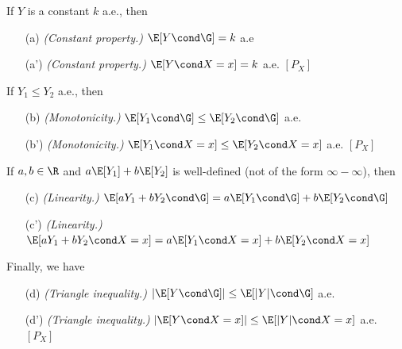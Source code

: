 \documentclass{article} %
\begin{document}
\begin{theorem}
If $Y$ is a constant $k$ a.e., then
\begin{itemize}
	\item[(a)] \textit{(Constant property.)} $\E[Y \cond \G]=k$ a.e
	\item[(a')] \textit{(Constant property.)} $\E[Y \cond X=x]=k$ a.e. $[P_X]$
\end{itemize}
If $Y_1 \leq Y_2$ a.e., then
\begin{itemize}
	\item[(b)] \textit{(Monotonicity.)} $\E[Y_1 \cond \G] \leq \E[Y_2 \cond \G]$ a.e.
	\item[(b')] \textit{(Monotonicity.)} $\E[Y_1 \cond X=x] \leq \E[Y_2 \cond X=x]$ a.e. $[P_X]$
\end{itemize}
If $a,b \in \R$ and $a \E[Y_1] + b \E[Y_2]$ is well-defined (not of the form $\infty-\infty$), then 
\begin{itemize}
	\item[(c)] \textit{(Linearity.)} $\E[aY_1 + bY_2 \cond \G] = a \E[Y_1 \cond \G] + b\E[Y_2 \cond \G] $
	\item[(c')] \textit{(Linearity.)}  $\E[aY_1 + bY_2 \cond X=x] = a \E[Y_1 \cond X=x] + b\E[Y_2 \cond X=x] $ 
\end{itemize}
Finally, we have
\begin{itemize}
	\item[(d)] \textit{(Triangle inequality.)} $| \E[Y \cond \G]| \leq \E[|Y| \cond \G]$ a.e.
	\item[(d')] \textit{(Triangle inequality.)}  $| \E[Y \cond X=x]| \leq \E[|Y| \cond X=x]$ a.e. $[P_X]$
\end{itemize}
\label{thm:conditional_expectation_properties_paired}
\end{theorem}
\end{document}
